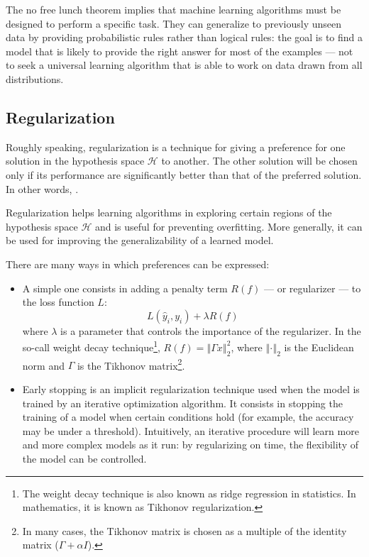             The no free lunch theorem implies that machine learning algorithms must be designed to perform a specific task. They can generalize to previously unseen data by providing probabilistic rules rather than logical rules: the goal is to find a model that is likely to provide the right answer for most of the examples --- not to seek a universal learning algorithm that is able to work on data drawn from all distributions.
        \subsection{Regularization}\label{regularization}
            Roughly speaking, regularization is a technique for giving a preference for one solution in the hypothesis space \(\mathcal{H}\) to another. The other solution will be chosen only if its performance are significantly better than that of the preferred solution. In other words,  \cite[120]{Goodfellow}.
            
            Regularization helps learning algorithms in exploring certain regions of the hypothesis space \(\mathcal{H}\) and is useful for preventing overfitting. More generally, it can be used for improving the generalizability of a learned model.
            
            There are many ways in which preferences can be expressed:
            \begin{itemize}
                \item A simple one consists in adding a penalty term \(R\left(f\right)\) --- or regularizer --- to the loss function \(L\):
                \[L\left(\hat{y}_{i},y_{i}\right) + \lambda R\left(f\right)\]
                where \(\lambda\) is a parameter that controls the importance of the regularizer. In the so-call weight decay technique\footnote{The weight decay technique is also known as ridge regression in statistics. In mathematics, it is known as Tikhonov regularization.}, \(R\left(f\right) = \left\Vert\Gamma x\right\Vert_{2}^{2}\), where \(\left\Vert\cdot\right\Vert_{2}\) is the Euclidean norm and \(\Gamma\) is the Tikhonov matrix\footnote{In many cases, the Tikhonov matrix is chosen as a multiple of the identity matrix (\(\Gamma + \alpha I\)).}.
                \item Early stopping is an implicit regularization technique used when the model is trained by an iterative optimization algorithm. It consists in stopping the training of a model when certain conditions hold (for example, the accuracy may be under a threshold). Intuitively, an iterative procedure will learn more and more complex models as it run: by regularizing on time, the flexibility of the model can be controlled.
            \end{itemize}
